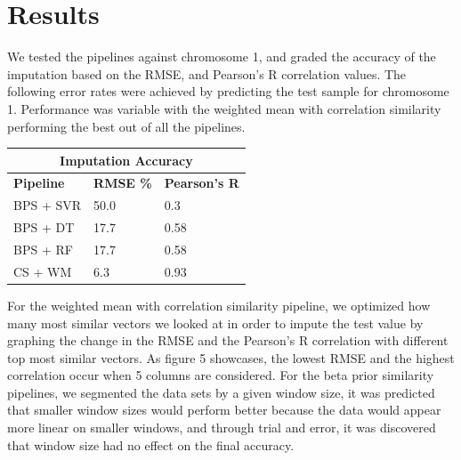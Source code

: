 \documentclass{article} %
\begin{document}
\section{Results}
We tested the pipelines against chromosome 1, and graded the accuracy of the imputation based on the RMSE, and Pearson's R correlation values. The following error rates were achieved by predicting the test sample for chromosome 1. Performance was variable with the weighted mean with correlation similarity performing the best out of all the pipelines.
\begin{center}
	\begin{tabular}{ |p{2cm}|p{2.3cm}|p{2.3cm}|}
		\hline
		\multicolumn{3}{|c|}{\textbf{Imputation Accuracy}} \\
		\hline
		\textbf{Pipeline} & \textbf{RMSE \%} & \textbf{Pearson's R} \\
		\hline
		BPS + SVR & 50.0 & 0.3 \\
		BPS + DT & 17.7  & 0.58 \\
		BPS + RF & 17.7 & 0.58 \\
		CS + WM & 6.3 & 0.93 \\
		\hline
	\end{tabular}
\end{center}

For the weighted mean with correlation similarity pipeline, we optimized how many most similar vectors we looked at in order to impute the test value by graphing the change in the RMSE and the Pearson's R correlation with different top most similar vectors. As figure 5 showcases, the lowest RMSE and the highest correlation occur when 5 columns are considered. For the beta prior similarity pipelines, we segmented the data sets by a given window size, it was predicted that smaller window sizes would perform better because the data would appear more linear on smaller windows, and through trial and error, it was discovered that window size had no effect on the final accuracy.
\end{document}
